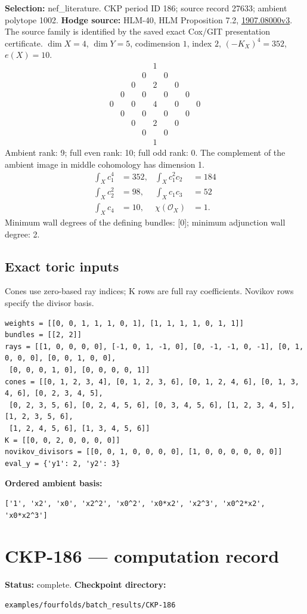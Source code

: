 \documentclass[10pt,a4paper]{article}
\newcommand{\hodge}[4]{\begin{array}{ccccccccc}
&&&&1&&&&\\&&&0&&0&&&\\&&0&&#1&&0&&\\&0&&#2&&#2&&0&\\
0&&#3&&#4&&#3&&0\\&0&&#2&&#2&&0&\\&&0&&#1&&0&&\\&&&0&&0&&&\\&&&&1&&&&\end{array}}
\begin{document}
\textbf{Selection:} nef\_literature.
CKP period ID 186; source record 27633; ambient polytope 1002.
\textbf{Hodge source:} HLM-40, HLM Proposition 7.2, \href{https://arxiv.org/abs/1907.08000v3}{1907.08000v3}.
The source family is identified by the saved exact Cox/GIT presentation certificate.
$\dim X=4$, $\dim Y=5$, codimension $1$, index $2$, $(-K_X)^4=352$, $e(X)=10$.
\[\hodge{2}{0}{0}{4}\]
Ambient rank: 9; full even rank: 10; full odd rank: 0. The complement of the ambient image in middle cohomology has dimension 1.
\[\begin{aligned}\int_Xc_1^4&=352,&\int_Xc_1^2c_2&=184\\\int_Xc_2^2&=98,&\int_Xc_1c_3&=52\\\int_Xc_4&=10,&\chi(\mathcal O_X)&=1.\end{aligned}\]
Minimum wall degrees of the defining bundles: [0]; minimum adjunction wall degree: 2.
\subsection*{Exact toric inputs}
Cones use zero-based ray indices; K rows are full ray coefficients. Novikov rows specify the divisor basis.

\begin{lstlisting}
weights = [[0, 0, 1, 1, 1, 0, 1], [1, 1, 1, 1, 0, 1, 1]]
bundles = [[2, 2]]
rays = [[1, 0, 0, 0, 0], [-1, 0, 1, -1, 0], [0, -1, -1, 0, -1], [0, 1, 0, 0, 0], [0, 0, 1, 0, 0],
 [0, 0, 0, 1, 0], [0, 0, 0, 0, 1]]
cones = [[0, 1, 2, 3, 4], [0, 1, 2, 3, 6], [0, 1, 2, 4, 6], [0, 1, 3, 4, 6], [0, 2, 3, 4, 5],
 [0, 2, 3, 5, 6], [0, 2, 4, 5, 6], [0, 3, 4, 5, 6], [1, 2, 3, 4, 5], [1, 2, 3, 5, 6],
 [1, 2, 4, 5, 6], [1, 3, 4, 5, 6]]
K = [[0, 0, 2, 0, 0, 0, 0]]
novikov_divisors = [[0, 0, 1, 0, 0, 0, 0], [1, 0, 0, 0, 0, 0, 0]]
eval_y = {'y1': 2, 'y2': 3}
\end{lstlisting}

\textbf{Ordered ambient basis:}
\begin{lstlisting}
['1', 'x2', 'x0', 'x2^2', 'x0^2', 'x0*x2', 'x2^3', 'x0^2*x2', 'x0*x2^3']
\end{lstlisting}

\clearpage\section*{CKP-186 --- computation record}
\textbf{Status:} complete.
\textbf{Checkpoint directory:}
\begin{lstlisting}
examples/fourfolds/batch_results/CKP-186
\end{lstlisting}
\end{document}
